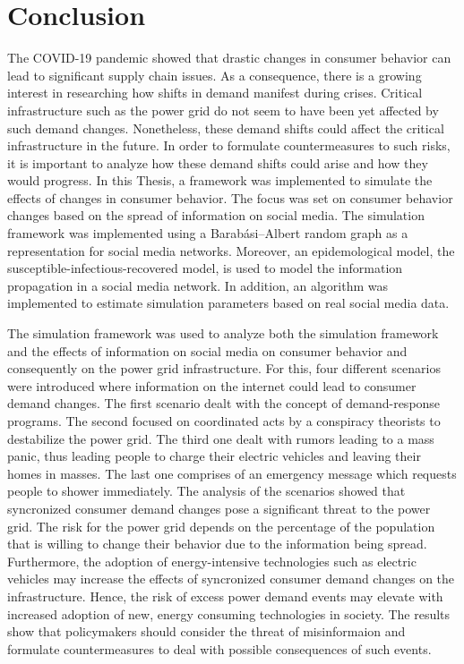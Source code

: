 \chapter{Conclusion}
\label{conclusion}

The COVID-19 pandemic showed that drastic changes in 
consumer behavior can lead to significant supply chain issues.
As a consequence, there is a growing interest in researching 
how shifts in demand manifest during crises. 
Critical infrastructure such as the power grid
do not seem to have been yet affected by such demand changes.
Nonetheless, these demand shifts could affect the critical 
infrastructure in the future. In order to 
formulate countermeasures to such risks, it is 
important to analyze how these demand shifts could 
arise and how they would progress. In this Thesis,
a framework was implemented to simulate the effects of 
changes in consumer behavior. The focus was set on
consumer behavior changes based on the spread
of information on social media. 
The simulation framework was implemented using 
a Barabási–Albert random graph as a representation for social 
media networks. Moreover, an epidemological model, 
the susceptible-infectious-recovered model, is used to model 
the information propagation in a social media network.
In addition, an algorithm was implemented to estimate 
simulation parameters based on real social media 
data. 

The simulation framework was used to analyze both 
the simulation framework and the effects of information 
on social media on consumer behavior and 
consequently on the power grid infrastructure.
For this, four different 
scenarios were introduced where information
on the internet could lead to consumer demand changes. 
The first scenario dealt with the concept of 
demand-response programs. The second focused on 
coordinated acts by a conspiracy theorists to destabilize 
the power grid. The third one dealt with rumors leading 
to a mass panic, thus leading people to charge their 
electric vehicles and leaving their homes in masses.
The last one comprises of an emergency message 
which requests people to shower immediately.
The analysis of the scenarios 
showed that syncronized consumer
demand changes pose a significant threat to the power
grid. The risk for the power grid depends on the percentage
of the population that is willing to change their behavior 
due to the information being spread.
Furthermore, the adoption
of energy-intensive technologies such as 
electric vehicles may increase the 
effects of syncronized consumer demand changes
on the infrastructure. 
Hence, the risk of excess power demand events may
elevate with increased adoption of new, energy consuming 
technologies in society.
The results show that policymakers should consider the
threat of misinformaion and formulate countermeasures
to deal with possible consequences of such events.

